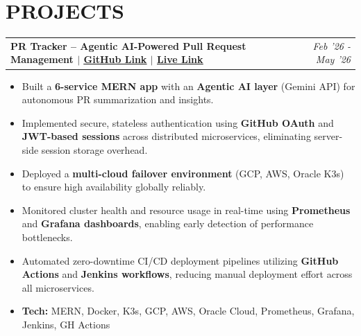 \documentclass[a4paper, 10pt]{article}
\makeatletter
\newcommand{\cvlink}[2]{\href{#1}{\textcolor{headerblue}{\uline{#2}}}}
\newcommand{\projectentry}[2]{
    \noindent\begin{tabularx}{\linewidth}{@{} X r @{}}
        \textbf{\color{headerblue}#1} & \textit{#2} \\
    \end{tabularx}
    \par\vspace{2pt}
}
\makeatother
\begin{document}
\section*{PROJECTS}
\begingroup
\sloppy
\projectentry{PR Tracker – Agentic AI-Powered Pull Request Management $|$ \cvlink{https://github.com/Dhruv1249/Pr-Tracker}{GitHub Link} $|$ \cvlink{https://pr-tracker.dev}{Live Link}}{Feb '26 - May '26}
\begin{itemize}
\item Built a \textbf{6-service MERN app} with an \textbf{Agentic AI layer} (Gemini API) for autonomous PR summarization and insights.
\item Implemented secure, stateless authentication using \textbf{GitHub OAuth} and \textbf{JWT-based sessions} across distributed microservices, eliminating server-side session storage overhead.
\item Deployed a \textbf{multi-cloud failover environment} (GCP, AWS, Oracle K3s) to ensure high availability globally reliably.
\item Monitored cluster health and resource usage in real-time using \textbf{Prometheus} and \textbf{Grafana dashboards}, enabling early detection of performance bottlenecks.
\item Automated zero-downtime CI/CD deployment pipelines utilizing \textbf{GitHub Actions} and \textbf{Jenkins workflows}, reducing manual deployment effort across all microservices.
\item[] \textbf{Tech:} MERN, Docker, K3s, GCP, AWS, Oracle Cloud, Prometheus, Grafana, Jenkins, GH Actions
\end{itemize}

\vspace{0.5em}
\end{document}
